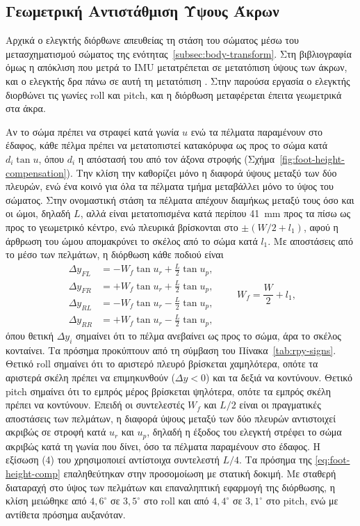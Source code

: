 \documentclass[11pt]{report}
\begin{document}
\subsection{Γεωμετρική Αντιστάθμιση Ύψους Άκρων}
\label{subsec:foot-height-comp}
Αρχικά ο ελεγκτής διόρθωνε απευθείας τη στάση του σώματος μέσω του
μετασχηματισμού σώματος της ενότητας~\ref{subsec:body-transform}. Στη βιβλιογραφία
όμως η απόκλιση που μετρά το IMU μετατρέπεται σε μετατόπιση ύψους των άκρων, και
ο ελεγκτής δρα πάνω σε αυτή τη μετατόπιση
\cite{mori_study_2022,prayogo_quadruped_2018}. Στην παρούσα εργασία ο ελεγκτής
διορθώνει τις γωνίες roll και pitch, και η διόρθωση μεταφέρεται έπειτα
γεωμετρικά στα άκρα.

Αν το σώμα πρέπει να στραφεί κατά γωνία $u$ ενώ τα πέλματα παραμένουν στο
έδαφος, κάθε πέλμα πρέπει να μετατοπιστεί κατακόρυφα ως προς το σώμα κατά
$d_i \tan u$, όπου $d_i$ η απόστασή του από τον άξονα στροφής
(Σχήμα~\ref{fig:foot-height-compensation}). Την κλίση την καθορίζει μόνο η
διαφορά ύψους μεταξύ των δύο πλευρών, ενώ ένα κοινό για όλα τα πέλματα τμήμα
μεταβάλλει μόνο το ύψος του σώματος. Στην ονομαστική στάση τα πέλματα απέχουν
διαμήκως μεταξύ τους όσο και οι ώμοι, δηλαδή $L$, αλλά είναι μετατοπισμένα
κατά περίπου 41~mm προς τα πίσω ως προς το γεωμετρικό κέντρο, ενώ πλευρικά
βρίσκονται στο $\pm(W/2 + l_1)$, αφού η άρθρωση του ώμου απομακρύνει το σκέλος
από το σώμα κατά $l_1$. Με αποστάσεις από το μέσο των πελμάτων, η διόρθωση
κάθε ποδιού είναι
\begin{equation}
\begin{aligned}
\Delta y_{FL} &= -W_f\tan u_r + \tfrac{L}{2}\tan u_p, \\
\Delta y_{FR} &= +W_f\tan u_r + \tfrac{L}{2}\tan u_p, \\
\Delta y_{RL} &= -W_f\tan u_r - \tfrac{L}{2}\tan u_p, \\
\Delta y_{RR} &= +W_f\tan u_r - \tfrac{L}{2}\tan u_p,
\end{aligned}
\qquad W_f = \frac{W}{2} + l_1,
\label{eq:foot-height-comp}
\end{equation}
όπου θετική $\Delta y_i$ σημαίνει ότι το πέλμα ανεβαίνει ως προς το σώμα, άρα
το σκέλος κονταίνει. Τα πρόσημα προκύπτουν από τη σύμβαση του
Πίνακα~\ref{tab:rpy-signs}. Θετικό roll σημαίνει ότι το αριστερό πλευρό
βρίσκεται χαμηλότερα, οπότε τα αριστερά σκέλη πρέπει να επιμηκυνθούν
($\Delta y < 0$) και τα δεξιά να κοντύνουν. Θετικό pitch σημαίνει ότι το εμπρός
μέρος βρίσκεται ψηλότερα, οπότε τα εμπρός σκέλη πρέπει να κοντύνουν. Επειδή οι
συντελεστές $W_f$ και $L/2$ είναι οι πραγματικές αποστάσεις των πελμάτων, η
διαφορά ύψους μεταξύ των δύο πλευρών αντιστοιχεί ακριβώς σε στροφή κατά $u_r$
και $u_p$, δηλαδή η έξοδος του ελεγκτή στρέφει το σώμα ακριβώς κατά τη γωνία
που δίνει, όσο τα πέλματα παραμένουν στο έδαφος. Η εξίσωση (4) του
\cite{mori_study_2022} χρησιμοποιεί αντίστοιχα συντελεστή $L/4$. Τα πρόσημα
της \eqref{eq:foot-height-comp} επαληθεύτηκαν στην προσομοίωση με στατική
δοκιμή. Με σταθερή διαταραχή στο ύψος των πελμάτων και επαναληπτική εφαρμογή
της διόρθωσης, η κλίση μειώθηκε από $4{,}6^\circ$ σε $3{,}5^\circ$ στο roll και
από $4{,}4^\circ$ σε $3{,}1^\circ$ στο pitch, ενώ με αντίθετα πρόσημα αυξανόταν.
\end{document}

